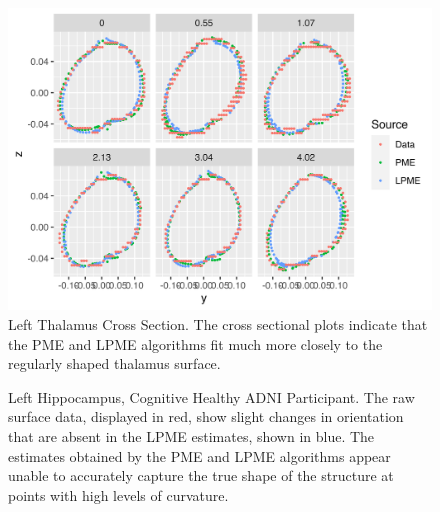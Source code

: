 \documentclass[11pt,reqno]{article}
\renewcommand{\textwidth}{180mm}
\theoremstyle{definition}
\begin{document}
\begin{figure}[h]
  \centering
  \includegraphics[height=8cm]{adni_plots/adni_lthal_cross_section}
  \caption{Left Thalamus Cross Section. The cross sectional plots indicate that the PME and LPME algorithms fit much more closely to the regularly shaped thalamus surface.}
  \label{fig:lthal_cross_sections}
\end{figure}

\begin{figure}%
  \centering
  \hfill
  \hfill

  \caption{Left Hippocampus, Cognitive Healthy ADNI Participant. The raw surface data, displayed in red, show slight changes in orientation that are absent in the LPME estimates, shown in blue. The estimates obtained by the PME and LPME algorithms appear unable to accurately capture the true shape of the structure at points with high levels of curvature.}
  \label{fig:adni_result}
\end{figure}
\end{document}
